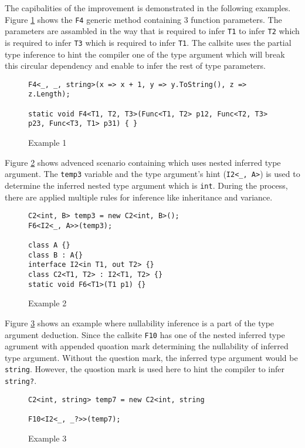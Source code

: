 The capibalities of the improvement is demonstrated in the following examples.
Figure \ref{img73:example1} shows the \texttt{F4} generic method containing 3 function parameters.
The parameters are assambled in the way that is required to infer \texttt{T1} to infer \texttt{T2} which is required to infer \texttt{T3} which is required to infer \texttt{T1}.
The callsite uses the partial type inference to hint the compiler one of the type argument which will break this circular dependency and enable to infer the rest of type parameters.
\begin{figure}[h]
\begin{lstlisting}[style=csharp, showstringspaces=false]
F4<_, _, string>(x => x + 1, y => y.ToString(), z => z.Length); 

static void F4<T1, T2, T3>(Func<T1, T2> p12, Func<T2, T3> p23, Func<T3, T1> p31) { }
\end{lstlisting}
\caption{Example 1}
\label{img73:example1}
\end{figure}
\par
Figure \ref{img74:example2} shows advenced scenario containing which uses nested inferred type argument.
The \texttt{temp3} variable and the type argument's hint (\texttt{I2<\_, A>}) is used to determine the inferred nested type argument which is \texttt{int}.
During the process, there are applied multiple rules for inference like inheritance and variance.
\begin{figure}[h]
\begin{lstlisting}[style=csharp, showstringspaces=false]
C2<int, B> temp3 = new C2<int, B>();
F6<I2<_, A>>(temp3);

class A {}
class B : A{}
interface I2<in T1, out T2> {}
class C2<T1, T2> : I2<T1, T2> {}
static void F6<T1>(T1 p1) {}
\end{lstlisting}
\caption{Example 2}
\label{img74:example2}
\end{figure}
\par
Figure \ref{img75:example3} shows an example where nullability inference is a part of the type argument deduction.
Since the callsite \texttt{F10} has one of the nested inferred type agrument with appended quoation mark determining the nullability of inferred type argument.
Without the question mark, the inferred type argument would be \texttt{string}.
However, the quostion mark is used here to hint the compiler to infer \texttt{string?}.
\begin{figure}[h]
\begin{lstlisting}[style=csharp, showstringspaces=false]
C2<int, string> temp7 = new C2<int, string

F10<I2<_, _?>>(temp7);
\end{lstlisting}
\caption{Example 3}
\label{img75:example3}
\end{figure}
